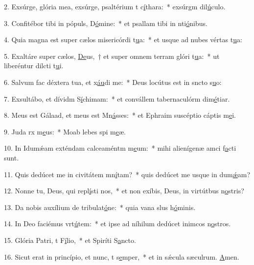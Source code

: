 2. Exsúrge, glória mea, exsúrge, psaltérium t c\uline{í}thara:~* exsúrgm dil\uline{ú}culo.\par 
3. Confitébor tibi in pópuls, D\uline{ó}mine:~* et psallam tibi in nti\uline{ó}nibus.\par 
4. Quia magna est super cælos misericórdi t\uline{u}a:~* et usque ad nubes vértas t\uline{u}a:\par 
5. Exaltáre super cælos, \uline{De}us,~† et super omnem terram glóri t\uline{u}a:~* ut liberéntur dilcti t\uline{u}i.\par 
6. Salvum fac déxtera tua, et x\uline{áu}di me:~* Deus locútus est in sncto s\uline{u}o:\par 
7. Exsultábo, et dívidm S\uline{í}chimam:~* et convállem tabernaculórm dim\uline{é}tiar.\par 
8. Meus est Gálaad, et meus est Mn\uline{á}sses:~* et Ephraim suscéptio cáptis m\uline{e}i.\par 
9. Juda rx m\uline{e}us:~* Moab lebes spi m\uline{e}æ.\par 
10. In Idumǽam exténdam calceaméntm m\uline{e}um:~* mihi alienígenæ amci f\uline{a}cti sunt.\par 
11. Quis dedúcet me in civitátem mn\uline{í}tam?~* quis dedúcet me usque in dum\uline{ǽ}am?\par 
12. Nonne tu, Deus, qui repl\uline{í}sti nos,~* et non exíbis, Deus, in virtútbus n\uline{o}stris?\par 
13. Da nobis auxílium de tribulat\uline{ó}ne:~* quia vana slus h\uline{ó}minis.\par 
14. In Deo faciémus vrt\uline{ú}tem:~* et ipse ad níhilum dedúcet inimcos n\uline{o}stros.\par 
15. Glória Patri, t F\uline{í}lio,~* et Spiríti S\uline{a}ncto.\par 
16. Sicut erat in princípio, et nunc, t s\uline{e}mper,~* et in sǽcula sæculrum. \uline{A}men.\par 
